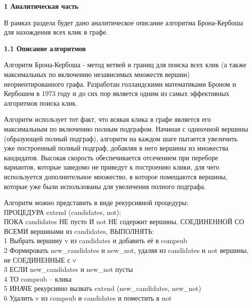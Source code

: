 \documentclass[a4paper,12pt]{report}
\begin{document}
	\setcounter{page}{2}
    \newpage

    \begin{center}
        \textbf{1 Аналитическая часть}
    \end{center}
        \label{sec:analitic_part}

        	В рамках раздела будет дано аналитическое описание алгоритма Брона-Кербоша для нахождения всех клик в графе.

	\begin{center}
        \textbf{1.1 Описание алгоритмов}
    \end{center}
        
	       Алгоритм Брона-Кербоша - метод ветвей и границ для поиска всех клик (а также максимальных по включению независимых множеств вершин) неориентированного графа. Разработан голландскими математиками Броном и Кербошем в 1973 году и до сих пор является одним из самых эффективных алгоритмов поиска клик.
	       
	       Алгоритм использует тот факт, что всякая клика в графе является его максимальным по включению полным подграфом. Начиная с одиночной вершины (образующей полный подграф), алгоритм на каждом шаге пытается увеличить уже построенный полный подграф, добавляя в него вершины из множества кандидатов. Высокая скорость обеспечивается отсечением при переборе вариантов, которые заведомо не приведут к построению клики, для чего используется дополнительное множество, в которое помещаются вершины, которые уже были использованы для увеличения полного подграфа.
	       \vspace{0.5cm}
	       
	       Алгоритм можно представить в виде рекурсивной процедуры:\\
	       ПРОЦЕДУРА extend (candidates, not):\\
	       ПОКА candidates НЕ пусто И not НЕ содержит вершины, СОЕДИНЕННОЙ СО ВСЕМИ вершинами из candidates, 
	       ВЫПОЛНЯТЬ:\\
	       1 Выбрать вершину v из candidates и добавить её в compsub\\
	       2 Формировать new\_candidates и new\_not, удаляя из candidates и not вершины, не СОЕДИНЕННЫЕ с v\\
	       3 ЕСЛИ new\_candidates и new\_not пусты\\
	       4 ТО compsub – клика\\
	       5 ИНАЧЕ рекурсивно вызвать extend (new\_candidates, new\_not)\\
	       6 Удалить v из compsub и candidates и поместить в not\\
\end{document}
